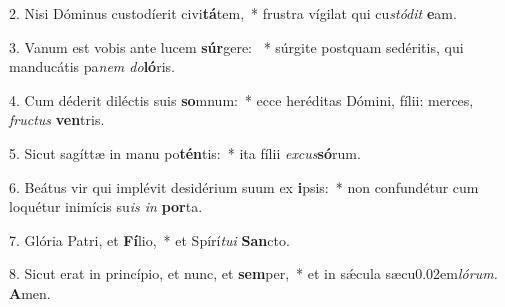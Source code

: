 \item 2. Nisi Dóminus custodíerit civi\textbf{tá}tem,~* frustra vígilat qui cu\hspace{0.03em}\textit{stódit} \textbf{e}am.

\item 3. Vanum est vobis ante lucem \textbf{súr}gere: ~* súrgite postquam sedéritis, qui manducátis pa\textit{nem do}\textbf{ló}ris.

\item 4. Cum déderit diléctis suis \textbf{so}mnum:~* ecce heréditas Dómini, fílii: merces, \textit{fructus} \textbf{ven}tris.

\item 5. Sicut sagíttæ in manu po\textbf{tén}tis:~* ita fílii \textit{excus}\textbf{só}rum.

\item 6. Beátus vir qui implévit desidérium suum ex \textbf{i}psis:~* non confundétur cum loquétur inimícis su\textit{is in} \textbf{por}ta.

\item 7. Glória Patri, et \textbf{Fí}lio,~* et Spírí\textit{tui} \textbf{San}cto.

\item 8. Sicut erat in princípio, et nunc, et \textbf{sem}per,~* et in sǽcula sæcu\kern 0.02em\textit{lórum.} \textbf{A}men.